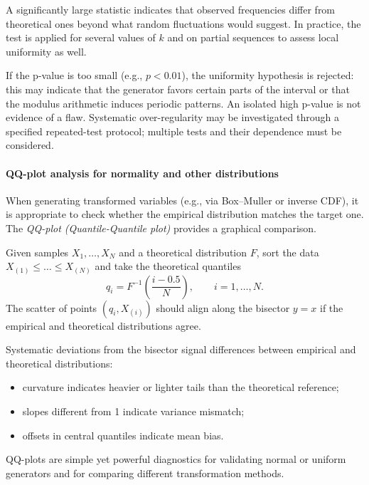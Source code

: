 \noindent
A significantly large statistic indicates that observed frequencies differ from theoretical ones beyond what random fluctuations would suggest. 
In practice, the test is applied for several values of \(k\) and on partial sequences to assess local uniformity as well.

\begin{remark}[Interpretation]
If the p-value is too small (e.g., \(p < 0.01\)), 
the uniformity hypothesis is rejected: 
this may indicate that the generator favors certain parts of the interval or that the modulus arithmetic induces periodic patterns. 
An isolated high p-value is not evidence of a flaw. Systematic
over-regularity may be investigated through a specified repeated-test
protocol; multiple tests and their dependence must be considered.
\end{remark}

\paragraph{QQ-plot analysis for normality and other distributions}

When generating transformed variables (e.g., via Box--Muller or inverse CDF), 
it is appropriate to check whether the empirical distribution matches the target one.
The \emph{QQ-plot (Quantile-Quantile plot)} provides a graphical comparison.

\begin{definition}
Given samples \(X_1, \dots, X_N\) and a theoretical distribution \(F\),
sort the data \(X_{(1)} \le \dots \le X_{(N)}\) and take the theoretical quantiles
\[
q_i = F^{-1}\!\left(\frac{i - 0.5}{N}\right), \qquad i = 1, \dots, N.
\]
The scatter of points \((q_i, X_{(i)})\) should align along the bisector \(y = x\) if the empirical and theoretical distributions agree.
\end{definition}

\begin{remark}
Systematic deviations from the bisector signal differences between empirical and theoretical distributions:
\begin{itemize}
    \item curvature indicates heavier or lighter tails than the theoretical reference;
    \item slopes different from 1 indicate variance mismatch;
    \item offsets in central quantiles indicate mean bias.
\end{itemize}
QQ-plots are simple yet powerful diagnostics for validating normal or uniform generators and for comparing different transformation methods.
\end{remark}

